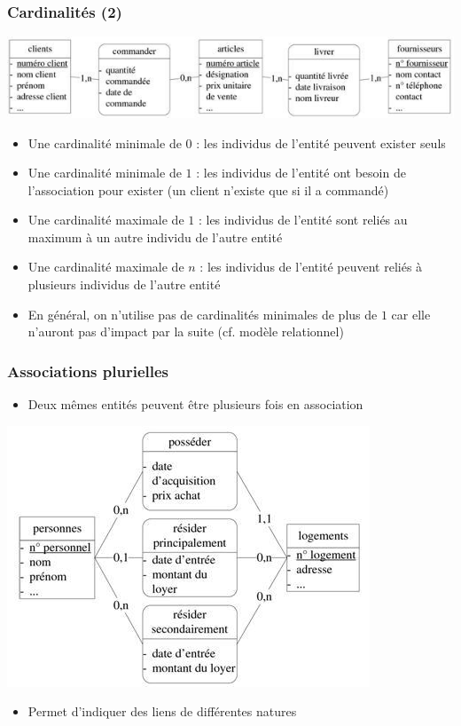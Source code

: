 \begin{frame}
  \frametitle{Cardinalités (2)}
  \begin{center}
    \includegraphics[width=0.9\linewidth]{cardinalites.jpg}
  \end{center}
  \begin{itemize}
    \item Une cardinalité minimale de $0$ : les individus de l'entité peuvent exister seuls
    \item Une cardinalité minimale de $1$ : les individus de l'entité ont besoin de l'association pour exister
      (un client n'existe que si il a commandé)
    \item Une cardinalité maximale de $1$ : les individus de l'entité sont reliés au maximum à un autre individu
      de l'autre entité
    \item Une cardinalité maximale de $n$ : les individus de l'entité peuvent reliés à plusieurs individus de
      l'autre entité
    \item En général, on n'utilise pas de cardinalités minimales de plus de $1$ car elle n'auront pas d'impact
      par la suite (cf. modèle relationnel)
  \end{itemize}
\end{frame}


\begin{frame}
  \frametitle{Associations plurielles}
  \begin{itemize}
    \item Deux mêmes entités peuvent être plusieurs fois en association
  \end{itemize}
  \begin{center}
    \includegraphics[width=0.6\linewidth]{associations_plurielles.jpg}
  \end{center}
  \begin{itemize}
    \item Permet d'indiquer des liens de différentes natures
  \end{itemize}
\end{frame}

